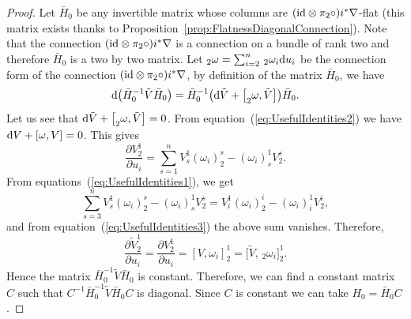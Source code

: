 \documentclass[pdftex]{sigma}
\numberwithin{equation}{section}
\begin{document}
 \begin{proof}
 Let $\bar{H}_{0}$ be any invertible matrix whose columns are $({\rm id}\otimes\pi_{2}\circ)i^{*}\nabla$-flat (this matrix exists thanks to Proposition~\ref{prop:FlatnessDiagonalConnection}). Note that the connection $({\rm id}\otimes\pi_{2}\circ)i^{*}\nabla$ is a connection on a bundle of rank two and therefore $\bar{H}_{0}$ is a two by two matrix. Let $_{2}\omega=\sum_{i=2}^{n}\,_{2}\omega_{i}{\rm d}u_{i}$ be the connection form of the connection $({\rm id}\otimes\pi_{2}\circ)i^{*}\nabla$, by definition of the matrix $\bar{H}_{0}$, we have
 \begin{equation*}
 {\rm d}\bigl(\bar{H}_{0}^{-1}\tilde{V}\bar{H}_{0}\bigr)=\bar{H}_{0}^{-1}\bigl({\rm d}\tilde{V}+\big[_{2}\omega,\tilde{V}\big]\bigr)\bar{H}_{0}.
 \end{equation*}
 Let us see that ${\rm d}\tilde{V}+\big[_{2}\omega,\tilde{V}\big]=0$. From equation~(\ref{eq:UsefulIdentities2}) we have ${\rm d}V+[\omega,V]=0$. This gives
 \begin{equation*}
 \frac{\partial V^{1}_{2}}{\partial u_{i}}=\sum_{s=1}^{n}V^{1}_{s}(\omega_{i})^{s}_{2}-(\omega_{i})^{1}_{s}V^{s}_{2}.
 \end{equation*}
 From equations~(\ref{eq:UsefulIdentities1}), we get
 \begin{equation*}
 \sum_{s=3}^{n}V^{1}_{s}(\omega_{i})^{s}_{2}-(\omega_{i})^{1}_{s}V^{s}_{2}=V^{1}_{i}(\omega_{i})^{i}_{2}-(\omega_{i})^{1}_{i}V^{i}_{2},
 \end{equation*}
 and from equation~(\ref{eq:UsefulIdentities3}) the above sum vanishes. Therefore,
 \begin{equation*}
 \frac{\partial\tilde{V}^{1}_{2}}{\partial u_{i}}=\frac{\partial V^{1}_{2}}{\partial u_{i}}=[V,\omega_{i}]^{1}_{2}=\big[\tilde{V}, \,_{2}\omega_{i}\big]^{1}_{2}.
 \end{equation*}
 Hence the matrix $\bar{H}_{0}^{-1}\tilde{V}\bar{H}_{0}$ is constant. Therefore, we can find a constant matrix $C$ such that $C^{-1}\bar{H}_{0}^{-1}\tilde{V}\bar{H}_{0}C$ is diagonal. Since $C$ is constant we can take $H_{0}=\bar{H}_{0}C$.
 \end{proof}
\end{document}
